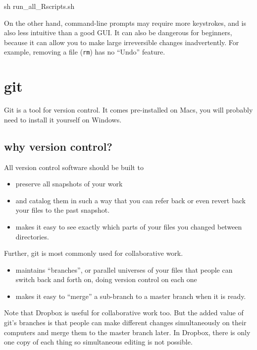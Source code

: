 \documentclass[]{book}
\newenvironment{Shaded}{\begin{snugshade}}{\end{snugshade}}
\newcommand{\FunctionTok}[1]{\textcolor[rgb]{0.00,0.00,0.00}{#1}}
\newcommand{\NormalTok}[1]{#1}
\providecommand{\tightlist}{%
  \setlength{\itemsep}{0pt}\setlength{\parskip}{0pt}}
\theoremstyle{definition}
\theoremstyle{definition}
\theoremstyle{definition}
\theoremstyle{remark}
\begin{document}
\begin{Shaded}
\begin{Highlighting}[]
\FunctionTok{sh}\NormalTok{ run_all_Rscripts.sh}
\end{Highlighting}
\end{Shaded}

On the other hand, command-line prompts may require more keystrokes, and
is also less intuitive than a good GUI. It can also be dangerous for
beginners, because it can allow you to make large irreversible changes
inadvertently. For example, removing a file (\texttt{rm}) has no
``Undo'' feature.

\section{git}\label{git}

Git is a tool for version control. It comes pre-installed on Macs, you
will probably need to install it yourself on Windows.

\subsection{why version control?}\label{why-version-control}

All version control software should be built to

\begin{itemize}
\tightlist
\item
  preserve all snapshots of your work
\item
  and catalog them in such a way that you can refer back or even revert
  back your files to the past snapshot.
\item
  makes it easy to see exactly which parts of your files you changed
  between directories.
\end{itemize}

Further, git is most commonly used for collaborative work.

\begin{itemize}
\tightlist
\item
  maintains ``branches'', or parallel universes of your files that
  people can switch back and forth on, doing version control on each one
\item
  makes it easy to ``merge'' a sub-branch to a master branch when it is
  ready.
\end{itemize}

Note that Dropbox is useful for collaborative work too. But the added
value of git's branches is that people can make different changes
simultaneously on their computers and merge them to the master branch
later. In Dropbox, there is only one copy of each thing so simultaneous
editing is not possible.
\end{document}
